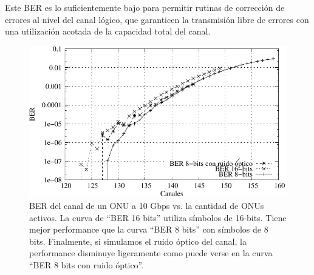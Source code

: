 Este BER es lo suficientemente bajo para permitir rutinas de corrección de errores al nivel del canal lógico, que garanticen la transmisión libre de errores con una utilización acotada de la capacidad total del canal.

\begin{figure}[t]
  \centering
  \includegraphics[width=5in]{graphs/BER-tesis.pdf} 
  \caption{BER del canal de un ONU a 10 Gbps vs. la cantidad de ONUs activos. La curva de ``BER 16 bits'' utiliza símbolos de 16-bits. Tiene mejor performance que la curva ``BER 8 bits'' con símbolos de 8 bits. Finalmente, si simulamos el ruido óptico del canal, la performance disminuye ligeramente como puede verse en la curva ``BER 8 bits con ruido óptico''.}
  \label{sim:access}
\end{figure}


